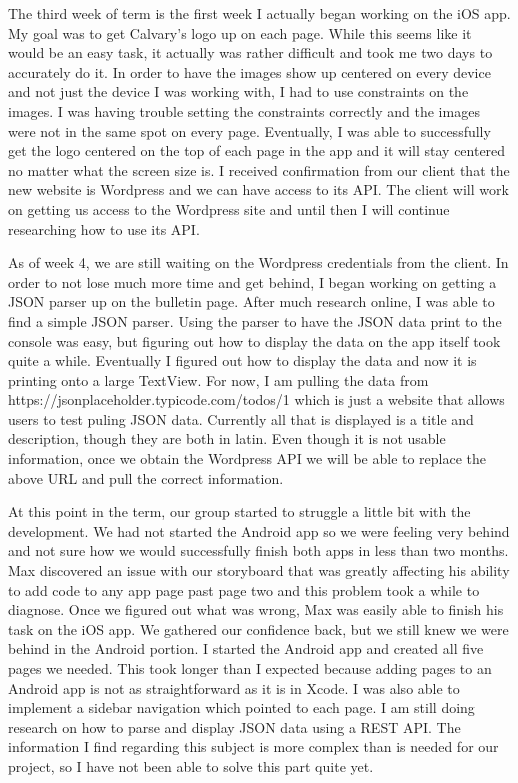 \documentclass[letterpaper,10pt,draftclsnofoot,onecolumn,titlepage]{IEEEtran}
\begin{document}
	The third week of term is the first week I actually began working on the iOS app. 
	My goal was to get Calvary's logo up on each page. 
	While this seems like it would be an easy task, it actually was rather difficult and took me two days to accurately do it. 
	In order to have the images show up centered on every device and not just the device I was working with, I had to use constraints on the images. 
	I was having trouble setting the constraints correctly and the images were not in the same spot on every page. 
	Eventually, I was able to successfully get the logo centered on the top of each page in the app and it will stay centered no matter what the screen size is. 
	I received confirmation from our client that the new website is Wordpress and we can have access to its API. 
	The client will work on getting us access to the Wordpress site and until then I will continue researching how to use its API. 
	
	As of week 4, we are still waiting on the Wordpress credentials from the client. 
	In order to not lose much more time and get behind, I began working on getting a JSON parser up on the bulletin page. 
	After much research online, I was able to find a simple JSON parser. 
	Using the parser to have the JSON data print to the console was easy, but figuring out how to display the data on the app itself took quite a while. 
	Eventually I figured out how to display the data and now it is printing onto a large TextView.
	For now, I am pulling the data from https://jsonplaceholder.typicode.com/todos/1 which is just a website that allows users to test puling JSON data. 
	Currently all that is displayed is a title and description, though they are both in latin. 
	Even though it is not usable information, once we obtain the Wordpress API we will be able to replace the above URL and pull the correct information. 
	
	At this point in the term, our group started to struggle a little bit with the development. 
	We had not started the Android app so we were feeling very behind and not sure how we would successfully finish both apps in less than two months. 
	Max discovered an issue with our storyboard that was greatly affecting his ability to add code to any app page past page two and this problem took a while to diagnose. 
	Once we figured out what was wrong, Max was easily able to finish his task on the iOS app. 
	We gathered our confidence back, but we still knew we were behind in the Android portion. 
	I started the Android app and created all five pages we needed. 
	This took longer than I expected because adding pages to an Android app is not as straightforward as it is in Xcode. 
	I was also able to implement a sidebar navigation which pointed to each page. 
	I am still doing research on how to parse and display JSON data using a REST API. 
	The information I find regarding this subject is more complex than is needed for our project, so I have not been able to solve this part quite yet. 
	
\end{document}
